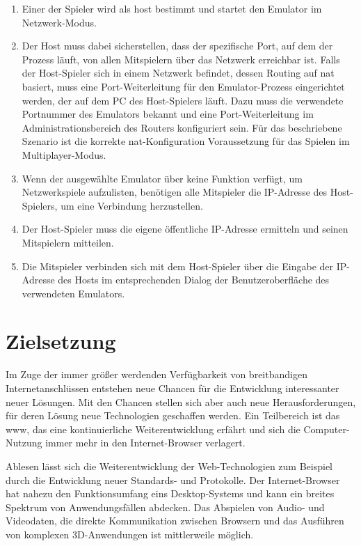 \begin{enumerate}
\def\labelenumi{\arabic{enumi}.}
\tightlist
\item
  Einer der Spieler wird als \gls{host} bestimmt und startet den
  Emulator im Netzwerk-Modus.
\item
  Der Host muss dabei sicherstellen, dass der spezifische Port, auf dem
  der Prozess läuft, von allen Mitspielern über das Netzwerk erreichbar
  ist. Falls der Host-Spieler sich in einem Netzwerk befindet, dessen
  Routing auf \gls{nat} basiert, muss eine Port-Weiterleitung für den
  Emulator-Prozess eingerichtet werden, der auf dem PC des Host-Spielers
  läuft. Dazu muss die verwendete Portnummer des Emulators bekannt und
  eine Port-Weiterleitung im Administrationsbereich des Routers
  konfiguriert sein. Für das beschriebene Szenario ist die korrekte
  \gls{nat}-Konfiguration Voraussetzung für das Spielen im
  Multiplayer-Modus.
\item
  Wenn der ausgewählte Emulator über keine Funktion verfügt, um
  Netzwerkspiele aufzulisten, benötigen alle Mitspieler die IP-Adresse
  des Host-Spielers, um eine Verbindung herzustellen.
\item
  Der Host-Spieler muss die eigene öffentliche IP-Adresse ermitteln und
  seinen Mitspielern mitteilen.
\item
  Die Mitspieler verbinden sich mit dem Host-Spieler über die Eingabe
  der IP-Adresse des Hosts im entsprechenden Dialog der
  Benutzeroberfläche des verwendeten Emulators.
\end{enumerate}

\section{Zielsetzung}\label{zielsetzung}

Im Zuge der immer größer werdenden Verfügbarkeit von breitbandigen
Internetanschlüssen entstehen neue Chancen für die Entwicklung
interessanter neuer Lösungen. Mit den Chancen stellen sich aber auch
neue Herausforderungen, für deren Lösung neue Technologien geschaffen
werden. Ein Teilbereich ist das \gls{www}, das eine kontinuierliche
Weiterentwicklung erfährt und sich die Computer-Nutzung immer mehr in
den Internet-Browser verlagert.

Ablesen lässt sich die Weiterentwicklung der Web-Technologien zum
Beispiel durch die Entwicklung neuer Standards- und Protokolle. Der
Internet-Browser hat nahezu den Funktionsumfang eins Desktop-Systems und
kann ein breites Spektrum von Anwendungsfällen abdecken. Das Abspielen
von Audio- und Videodaten, die direkte Kommunikation zwischen Browsern
und das Ausführen von komplexen 3D-Anwendungen ist mittlerweile möglich.


